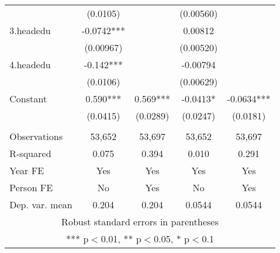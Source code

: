 \begin{tabular}{lcccc}
 & (0.0105) &  & (0.00560) &  \\
3.headedu & -0.0742*** &  & 0.00812 &  \\
 & (0.00967) &  & (0.00520) &  \\
4.headedu & -0.142*** &  & -0.00794 &  \\
 & (0.0106) &  & (0.00629) &  \\
Constant & 0.590*** & 0.569*** & -0.0413* & -0.0634*** \\
 & (0.0415) & (0.0289) & (0.0247) & (0.0181) \\
 &  &  &  &  \\
Observations & 53,652 & 53,697 & 53,652 & 53,697 \\
R-squared & 0.075 & 0.394 & 0.010 & 0.291 \\
Year FE & Yes & Yes & Yes & Yes \\
Person FE & No & Yes & No & Yes \\
 Dep. var. mean & 0.204 & 0.204 & 0.0544 & 0.0544 \\ \hline
\multicolumn{5}{c}{ Robust standard errors in parentheses} \\
\multicolumn{5}{c}{ *** p$<$0.01, ** p$<$0.05, * p$<$0.1} \\
\end{tabular}
